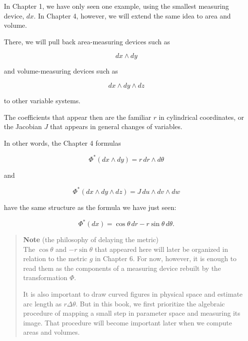 \documentclass[a4paper,12pt,openany]{book}
\begin{document}
In Chapter 1, we have only seen one example, using the smallest
measuring device, \(dx\). In Chapter 4, however, we will extend the same
idea to area and volume.

There, we will pull back area-measuring devices such as

\[
dx\wedge dy
\]

and volume-measuring devices such as

\[
dx\wedge dy\wedge dz
\]

to other variable systems.

The coefficients that appear then are the familiar \(r\) in cylindrical
coordinates, or the Jacobian \(J\) that appears in general changes of
variables.

In other words, the Chapter 4 formulas

\[
\Phi^*(dx\wedge dy)=r\,dr\wedge d\theta
\]

and

\[
\Phi^*(dx\wedge dy\wedge dz)=J\,du\wedge dv\wedge dw
\]

have the same structure as the formula we have just seen:

\[
\Phi^*(dx)
=
\cos\theta\,dr-r\sin\theta\,d\theta.
\]

\begin{quote}
\textbf{Note} (the philosophy of delaying the metric)\\
The \(\cos\theta\) and \(-r\sin\theta\) that appeared here will later be
organized in relation to the metric \(g\) in Chapter 6. For now,
however, it is enough to read them as the components of a measuring
device rebuilt by the transformation \(\Phi\).

It is also important to draw curved figures in physical space and
estimate arc length as \(r\Delta\theta\). But in this book, we first
prioritize the algebraic procedure of mapping a small step in parameter
space and measuring its image. That procedure will become important
later when we compute areas and volumes.
\end{quote}

\par\vspace{0.35em}\par
\end{document}
